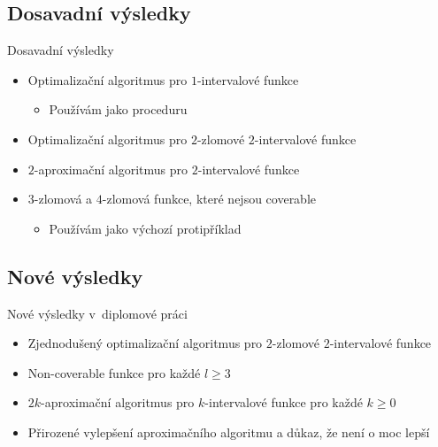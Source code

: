 \documentclass{beamer}
\theoremstyle{remark}
\begin{document}
\subsection{Dosavadní výsledky}

\begin{frame}{Dosavadní výsledky}

\begin{itemize}
\item
Optimalizační algoritmus pro $1$-intervalové funkce \citep{Schieber2005154}
\begin{itemize}
\item Používám jako proceduru
\end{itemize}

\item
Optimalizační algoritmus pro $2$-zlomové $2$-intervalové funkce \citep{Dubovsky2012}

\item
$2$-aproximační algoritmus pro $2$-intervalové funkce \citep{Dubovsky2012}

\item $3$-zlomová a $4$-zlomová funkce,
které nejsou coverable \citep{Dubovsky2012}
\begin{itemize}
\item Používám jako výchozí protipříklad
\end{itemize}
\end{itemize}
\end{frame}

\subsection{Nové výsledky}

\begin{frame}{Nové výsledky v~diplomové práci}
\begin{itemize}
\item Zjednodušený optimalizační algoritmus pro $2$-zlomové $2$-intervalové funkce
\item Non-coverable funkce pro každé $l \geq 3$
\item $2k$-aproximační algoritmus pro $k$-intervalové funkce pro každé $k \geq 0$
\item Přirozené vylepšení aproximačního algoritmu a důkaz, že není o moc lepší
\end{itemize}
\end{frame}
\end{document}
